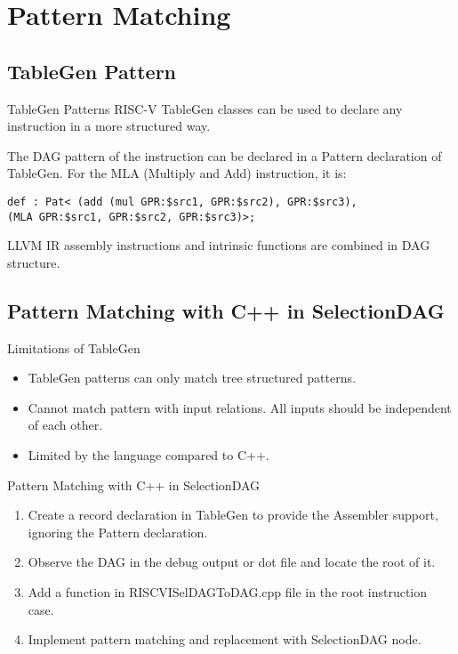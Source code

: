
\section{Pattern Matching}
\subsection{TableGen Pattern}
\begin{frame}[fragile]{TableGen Patterns}
    RISC-V TableGen classes can be used to declare any instruction in a more structured way.
    \par
    The DAG pattern of the instruction can be declared in a Pattern declaration of TableGen. For the MLA (Multiply and Add) instruction, it is:

\begin{lstlisting}
def : Pat< (add (mul GPR:$src1, GPR:$src2), GPR:$src3),
(MLA GPR:$src1, GPR:$src2, GPR:$src3)>;
\end{lstlisting}
LLVM IR assembly instructions and intrinsic functions are combined in DAG structure. 
\end{frame}

\subsection{Pattern Matching with C++ in SelectionDAG}
\begin{frame}[fragile]{Limitations of TableGen}
\begin{itemize}
    \item TableGen patterns can only match tree structured patterns.
    \item Cannot match pattern with input relations. All inputs should be independent of each other.
    \item Limited by the language compared to C++.
\end{itemize}


\end{frame}

\begin{frame}{Pattern Matching with C++ in SelectionDAG}
\begin{enumerate}
    \item Create a record declaration in TableGen to provide the Assembler support, ignoring the Pattern declaration.
    \item Observe the DAG in the debug output or dot file and locate the root of it. 
    \item Add a function in RISCVISelDAGToDAG.cpp file in the root instruction case. 
    \item Implement pattern matching and replacement with SelectionDAG node.
\end{enumerate}
\end{frame}

